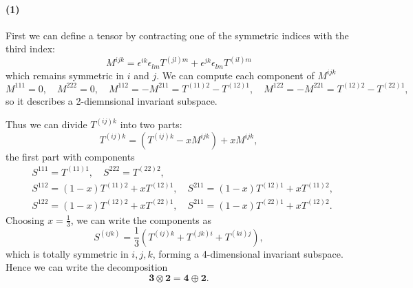 \documentclass[12pt]{article}
\begin{document}
\paragraph{(1)}
First we can define a tensor by contracting one of the symmetric indices with the third index:
\begin{equation*}
  M^{ijk} = \epsilon^{ik} \epsilon_{lm} T^{(jl)m} + \epsilon^{jk} \epsilon_{lm} T^{(il)m}
\end{equation*}
which remains symmetric in $i$ and $j$.
We can compute each component of $M^{ijk}$
\begin{equation*}
  M^{111} = 0, \quad M^{222} = 0, \quad M^{112} = -M^{211} = T^{(11)2} - T^{(12)1}, \quad M^{122} = -M^{221} = T^{(12)2} - T^{(22)1},
\end{equation*}
so it describes a 2-diemnsional invariant subspace.

Thus we can divide $T^{(ij)k}$ into two parts:
\begin{equation*}
  T^{(ij)k} = (T^{(ij)k} - xM^{ijk}) + xM^{ijk},
\end{equation*}
the first part with components
\begin{align*}
  &S^{111} = T^{(11)1},\quad S^{222} = T^{(22)2}, \\
  &S^{112} = (1 - x) T^{(11)2} + x T^{(12)1}, \quad S^{211} = (1 - x) T^{(12)1} + xT^{(11)2}, \\
  &S^{122} = (1 - x) T^{(12)2} + x T^{(22)1}, \quad S^{211} = (1 - x) T^{(22)1} + xT^{(12)2}.
\end{align*}
Choosing $x = \frac{1}{3}$, we can write the components as
\begin{equation*}
  S^{(ijk)} = \frac{1}{3} (T^{(ij)k} + T^{(jk)i} + T^{(ki)j}),
\end{equation*}
which is totally symmetric in $i, j, k$, forming a 4-dimensional invariant subspace.
Hence we can write the decomposition
\begin{equation*}
  \boldsymbol{3} \otimes \boldsymbol{2} = \boldsymbol{4} \oplus \boldsymbol{2}.
\end{equation*}
\end{document}
